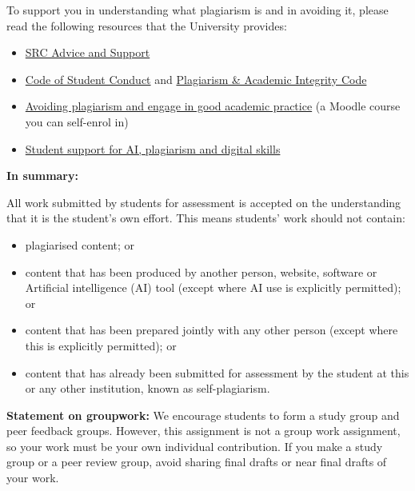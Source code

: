 \documentclass[
  english,
  letterpaper,
  DIV=11,
  numbers=noendperiod]{scrreprt}
\providecommand{\tightlist}{%
  \setlength{\itemsep}{0pt}\setlength{\parskip}{0pt}}
\begin{document}
To support you in understanding what plagiarism is and in avoiding it,
please read the following resources that the University provides:

\begin{itemize}
\tightlist
\item
  \href{https://www.glasgowunisrc.org/advice/}{SRC Advice and Support}
\item
  \href{https://www.gla.ac.uk/myglasgow/apg/policies/uniregs/regulations2025-26/feesandgeneral/studentsupportandconductmatters/reg33/}{Code
  of Student Conduct} and
  \href{https://www.gla.ac.uk/myglasgow/apg/policies/uniregs/regulations2025-26/feesandgeneral/studentsupportandconductmatters/reg32/}{Plagiarism
  \& Academic Integrity Code}
\item
  \href{https://moodle.gla.ac.uk/course/view.php?id=13038}{Avoiding
  plagiarism and engage in good academic practice} (a Moodle course you
  can self-enrol in)
\item
  \href{https://www.gla.ac.uk/myglasgow/sld/}{Student support for AI,
  plagiarism and digital skills}
\end{itemize}

\textbf{In summary:}

All work submitted by students for assessment is accepted on the
understanding that it is the student's own effort. This means students'
work should not contain:

\begin{itemize}
\tightlist
\item
  plagiarised content; or
\item
  content that has been produced by another person, website, software or
  Artificial intelligence (AI) tool (except where AI use is explicitly
  permitted); or
\item
  content that has been prepared jointly with any other person (except
  where this is explicitly permitted); or
\item
  content that has already been submitted for assessment by the student
  at this or any other institution, known as self-plagiarism.
\end{itemize}

\textbf{Statement on groupwork:} We encourage students to form a study
group and peer feedback groups. However, this assignment is not a group
work assignment, so your work must be your own individual contribution.
If you make a study group or a peer review group, avoid sharing final
drafts or near final drafts of your work.
\end{document}
